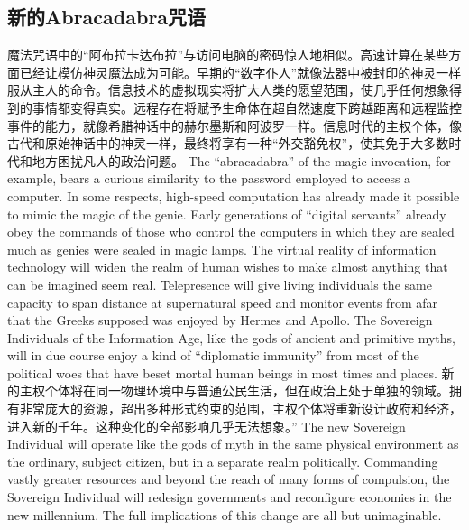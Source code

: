 \subsection{新的Abracadabra咒语}
\begin{paracol}{2}[]
魔法咒语中的“阿布拉卡达布拉”与访问电脑的密码惊人地相似。高速计算在某些方面已经让模仿神灵魔法成为可能。早期的“数字仆人”就像法器中被封印的神灵一样服从主人的命令。信息技术的虚拟现实将扩大人类的愿望范围，使几乎任何想象得到的事情都变得真实。远程存在将赋予生命体在超自然速度下跨越距离和远程监控事件的能力，就像希腊神话中的赫尔墨斯和阿波罗一样。信息时代的主权个体，像古代和原始神话中的神灵一样，最终将享有一种“外交豁免权”，使其免于大多数时代和地方困扰凡人的政治问题。
\switchcolumn
The ``abracadabra'' of the magic invocation, for example, bears a curious similarity to the password employed to access a computer. In some respects, high-speed computation has already made it possible to mimic the magic of the genie. Early generations of ``digital servants'' already obey the commands of those who control the computers in which they are sealed much as genies were sealed in magic lamps. The virtual reality of information technology will widen the realm of human wishes to make almost anything that can be imagined seem real. Telepresence will give living individuals the same capacity to span distance at supernatural speed and monitor events from afar that the Greeks supposed was enjoyed by Hermes and Apollo. The Sovereign Individuals of the Information Age, like the gods of ancient and primitive myths, will in due course enjoy a kind of ``diplomatic immunity'' from most of the political woes that have beset mortal human beings in most times and places.
\switchcolumn*
新的主权个体将在同一物理环境中与普通公民生活，但在政治上处于单独的领域。拥有非常庞大的资源，超出多种形式约束的范围，主权个体将重新设计政府和经济，进入新的千年。这种变化的全部影响几乎无法想象。”
\switchcolumn
The new Sovereign Individual will operate like the gods of myth in the same physical environment as the ordinary, subject citizen, but in a separate realm politically. Commanding vastly greater resources and beyond the reach of many forms of compulsion, the Sovereign Individual will redesign governments and reconfigure economies in the new millennium. The full implications of this change are all but unimaginable.
\end{paracol}


